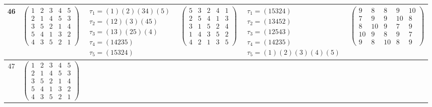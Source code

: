 \begin{longtable}{|c|p{2.7cm}|p{2.7cm}|p{2.7cm}|p{2.7cm}|p{3.3cm}|}
    \hline
    46                                                                                                                                          &
    $\begin{pmatrix}1&2&3&4&5\\2&1&4&5&3\\3&5&2&1&4\\5&4&1&3&2\\4&3&5&2&1\end{pmatrix}$                                                         &
    $\begin{array}{l}\tau_{1}=(1)(2)(34)(5)\\ \tau_{2}=(12)(3)(45)\\ \tau_{3}=(13)(25)(4)\\ \tau_{4}=(14235)\\ \tau_{5}=(15324)\end{array}$     &
    $\begin{pmatrix}5&3&2&4&1\\2&5&4&1&3\\3&1&5&2&4\\1&4&3&5&2\\4&2&1&3&5\end{pmatrix}$                                                         &
    $\begin{array}{l}\tau_{1}=(15324)\\ \tau_{2}=(13452)\\ \tau_{3}=(12543)\\ \tau_{4}=(14235)\\ \tau_{5}=(1)(2)(3)(4)(5)\end{array}$           &
    $\begin{pmatrix}9&8&8&9&10\\7&9&9&10&8\\8&10&9&7&9\\10&9&8&9&7\\9&8&10&8&9\end{pmatrix}$                                                                                                                                \\
    \hline
    47                                                                                                                                          &
    $\begin{pmatrix}1&2&3&4&5\\2&1&4&5&3\\3&5&2&1&4\\5&4&1&3&2\\4&3&5&2&1\end{pmatrix}$                                                         &

\end{longtable}
